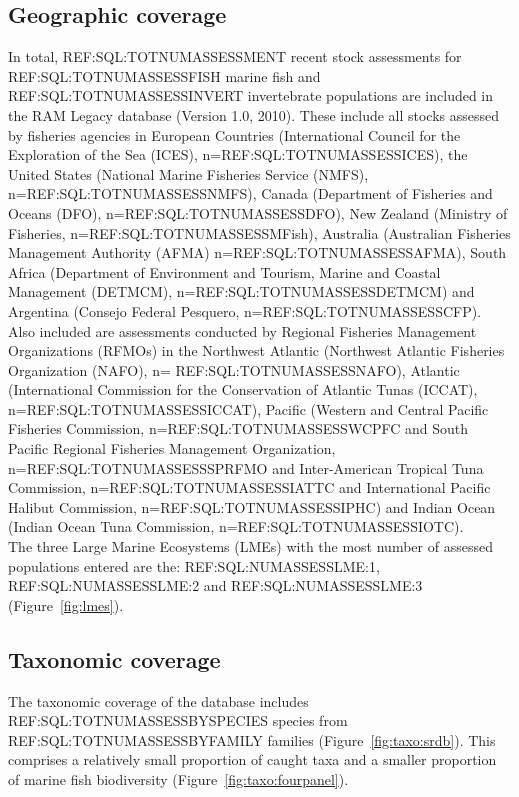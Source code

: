 \subsection*{Geographic coverage}
In total, REF:SQL:TOTNUMASSESSMENT recent stock assessments for
REF:SQL:TOTNUMASSESSFISH marine fish and REF:SQL:TOTNUMASSESSINVERT
invertebrate populations are included in the RAM Legacy database
(Version 1.0, 2010). These include all stocks assessed by fisheries
agencies in European Countries (International Council for the
Exploration of the Sea (ICES), n=REF:SQL:TOTNUMASSESSICES), the United
States (National Marine Fisheries Service (NMFS),
n=REF:SQL:TOTNUMASSESSNMFS), Canada (Department of Fisheries and
Oceans (DFO), n=REF:SQL:TOTNUMASSESSDFO), New Zealand (Ministry of
Fisheries, n=REF:SQL:TOTNUMASSESSMFish), Australia (Australian
Fisheries Management Authority (AFMA) n=REF:SQL:TOTNUMASSESSAFMA),
South Africa (Department of Environment and Tourism, Marine and
Coastal Management (DETMCM), n=REF:SQL:TOTNUMASSESSDETMCM) and
Argentina (Consejo Federal Pesquero, n=REF:SQL:TOTNUMASSESSCFP).  Also
included are assessments conducted by Regional Fisheries Management
Organizations (RFMOs) in the Northwest Atlantic (Northwest Atlantic
Fisheries Organization (NAFO), n= REF:SQL:TOTNUMASSESSNAFO), Atlantic
(International Commission for the Conservation of Atlantic Tunas
(ICCAT), n=REF:SQL:TOTNUMASSESSICCAT), Pacific (Western and Central
Pacific Fisheries Commission, n=REF:SQL:TOTNUMASSESSWCPFC and South
Pacific Regional Fisheries Management Organization,
n=REF:SQL:TOTNUMASSESSSPRFMO and Inter-American Tropical Tuna
Commission, n=REF:SQL:TOTNUMASSESSIATTC and International Pacific
Halibut Commission, n=REF:SQL:TOTNUMASSESSIPHC) and Indian Ocean
(Indian Ocean Tuna Commission, n=REF:SQL:TOTNUMASSESSIOTC). \\
The three Large Marine Ecosystems (LMEs) with the most number of assessed populations entered are the: REF:SQL:NUMASSESSLME:1, REF:SQL:NUMASSESSLME:2 and REF:SQL:NUMASSESSLME:3 (Figure~\ref{fig:lmes}). \\
\subsection*{Taxonomic coverage}
The taxonomic coverage of the database includes REF:SQL:TOTNUMASSESSBYSPECIES species from REF:SQL:TOTNUMASSESSBYFAMILY families (Figure~\ref{fig:taxo:srdb}). This comprises a relatively small proportion of caught taxa and a smaller proportion of marine fish biodiversity (Figure~\ref{fig:taxo:fourpanel}).\\


